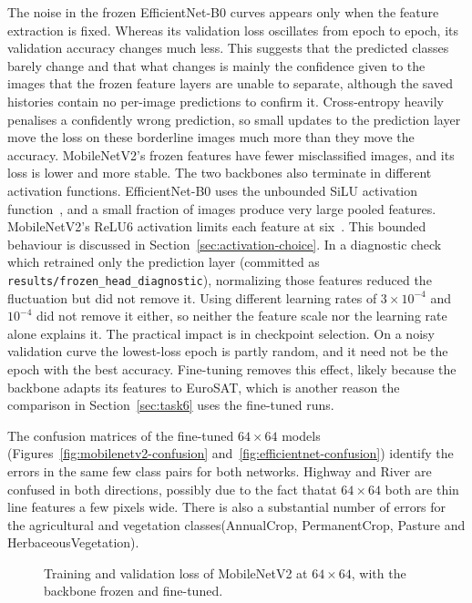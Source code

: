 The noise in the frozen EfficientNet-B0 curves appears only when the feature extraction is fixed. Whereas its validation loss oscillates from epoch to
epoch, its validation accuracy changes much less. This suggests that the predicted classes
barely change and that what changes is mainly the confidence given to the images that
the frozen feature layers are unable to separate, although the saved histories
contain no per-image predictions to confirm it. Cross-entropy heavily penalises a confidently
wrong prediction, so small updates to the prediction layer move the
loss on these borderline images much more than they move the accuracy.
MobileNetV2's frozen features have fewer misclassified images, and its loss is lower
and more stable. The two backbones also terminate in different activation functions.
EfficientNet-B0 uses the unbounded SiLU
activation function~\cite{tan2019efficientnet}, and a small fraction of images produce
very large pooled features. 
MobileNetV2's ReLU6 activation limits each feature at
six~\cite{sandler2018mobilenetv2}. This bounded behaviour is discussed in
Section~\ref{sec:activation-choice}. In a diagnostic check which retrained only the prediction
layer (committed as \texttt{results/frozen\_head\_diagnostic}), normalizing those
features reduced the fluctuation but did not remove it.
Using different learning rates of $3\times10^{-4}$ and $10^{-4}$
did not remove it either, so neither the feature scale nor the learning rate
alone explains it.
The practical impact is in checkpoint selection. On a noisy validation curve
the lowest-loss epoch is partly random, and it need not be the
epoch with the best accuracy. Fine-tuning removes this effect, likely because the backbone
adapts its features to EuroSAT, which is another reason the comparison in
Section~\ref{sec:task6} uses the fine-tuned runs.

The confusion matrices of the fine-tuned $64\times64$ models
(Figures~\ref{fig:mobilenetv2-confusion} and~\ref{fig:efficientnet-confusion})
identify the errors in the same few class pairs for both networks.
Highway and River are confused in both directions, possibly due to the fact thatat $64\times64$ both are
thin line features a few pixels wide. There is also a substantial number of errors for the agricultural and vegetation
classes(AnnualCrop, PermanentCrop, Pasture and HerbaceousVegetation).

\begin{figure}[htbp]
  \centering
  \caption{Training and validation loss of MobileNetV2 at $64\times64$, with
  the backbone frozen and fine-tuned.}
  \label{fig:sota-loss}
\end{figure}

